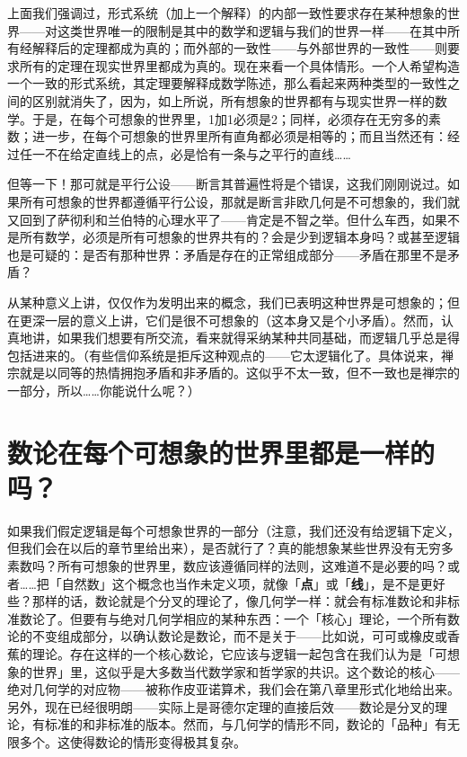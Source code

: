 \documentclass[
  12pt,
  twoside,
  openright,
  oldfontcommands,
]{memoir}
\newcommand{\heititext}[1]{{\heifamily\bfseries #1}}
\begin{document}
上面我们强调过，形式系统（加上一个解释）的内部一致性要求存在某种想象的世界------对这类世界唯一的限制是其中的数学和逻辑与我们的世界一样------在其中所有经解释后的定理都成为真的；而外部的一致性------与外部世界的一致性------则要求所有的定理在现实世界里都成为真的。现在来看一个具体情形。一个人希望构造一个一致的形式系统，其定理要解释成数学陈述，那么看起来两种类型的一致性之间的区别就消失了，因为，如上所说，所有想象的世界都有与现实世界一样的数学。于是，在每个可想象的世界里，1加1必须是2；同样，必须存在无穷多的素数；进一步，在每个可想象的世界里所有直角都必须是相等的；而且当然还有：经过任一不在给定直线上的点，必是恰有一条与之平行的直线\ldots\ldots{}

但等一下！那可就是平行公设------断言其普遍性将是个错误，这我们刚刚说过。如果所有可想象的世界都遵循平行公设，那就是断言非欧几何是不可想象的，我们就又回到了萨彻利和兰伯特的心理水平了------肯定是不智之举。但什么车西，如果不是所有数学，必须是所有可想象的世界共有的？会是少到逻辑本身吗？或甚至逻辑也是可疑的：是否有那种世界：矛盾是存在的正常组成部分------矛盾在那里不是矛盾？

从某种意义上讲，仅仅作为发明出来的概念，我们已表明这种世界是可想象的；但在更深一层的意义上讲，它们是很不可想象的（这本身又是个小矛盾）。然而，认真地讲，如果我们想要有所交流，看来就得采纳某种共同基础，而逻辑几乎总是得包括进来的。（有些信仰系统是拒斥这种观点的------它太逻辑化了。具体说来，禅宗就是以同等的热情拥抱矛盾和非矛盾的。这似乎不太一致，但不一致也是禅宗的一部分，所以\ldots\ldots 你能说什么呢？）

\section{数论在每个可想象的世界里都是一样的吗？}

如果我们假定逻辑是每个可想象世界的一部分（注意，我们还没有给逻辑下定义，但我们会在以后的章节里给出来），是否就行了？真的能想象某些世界没有无穷多素数吗？所有可想象的世界里，数应该遵循同样的法则，这难道不是必要的吗？或者\ldots\ldots 把「自然数」这个概念也当作未定义项，就像「\heititext{点}」或「\heititext{线}」，是不是更好些？那样的话，数论就是个分叉的理论了，像几何学一样：就会有标准数论和非标准数论了。但要有与绝对几何学相应的某种东西：一个「核心」理论，一个所有数论的不变组成部分，以确认数论是数论，而不是关于------比如说，可可或橡皮或香蕉的理论。存在这样的一个核心数论，它应该与逻辑一起包含在我们认为是「可想象的世界」里，这似乎是大多数当代数学家和哲学家的共识。这个数论的核心------绝对几何学的对应物------被称作皮亚诺算术，我们会在第八章里形式化地给出来。另外，现在已经很明朗------实际上是哥德尔定理的直接后效------数论是分叉的理论，有标准的和非标准的版本。然而，与几何学的情形不同，数论的「品种」有无限多个。这使得数论的情形变得极其复杂。
\end{document}

